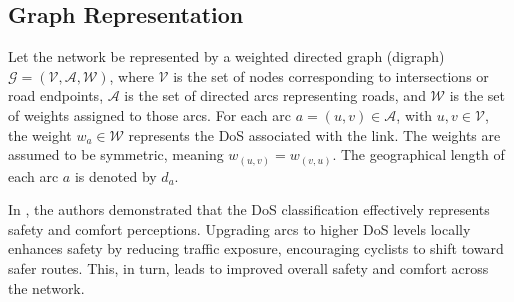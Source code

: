 \documentclass[letterpaper, 10 pt, conference]{ieeeconf}  %
\begin{document}
\subsection{Graph Representation}

Let the network be represented by a weighted directed graph (digraph) $\mathcal{G} = (\mathcal{V}, \mathcal{A}, \mathcal{W})$, where $\mathcal{V}$ is the set of nodes corresponding to intersections or road endpoints, $\mathcal{A}$ is the set of directed arcs representing roads, and $\mathcal{W}$ is the set of weights assigned to those arcs. For each arc $a = (u, v) \in \mathcal{A}$, with $u,v \in \mathcal{V}$, the weight $w_a \in \mathcal{W}$ represents the DoS associated with the link. The weights are assumed to be symmetric, meaning $w_{(u,v)} = w_{(v,u)}$. The geographical length of each arc $a$ is denoted by $d_a$.

In \cite{2024graphbased}, the authors demonstrated that the DoS classification effectively represents safety and comfort perceptions. Upgrading arcs to higher DoS levels locally enhances safety by reducing traffic exposure, encouraging cyclists to shift toward safer routes. This, in turn, leads to improved overall safety and comfort across the network.
\end{document}
